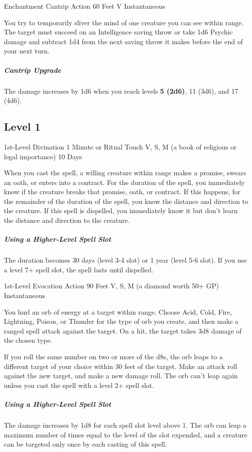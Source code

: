 \documentclass[letterpaper,openany,oneside,twocolumn]{book}
\begin{document}
	{Enchantment Cantrip}
	{Action}
	{60 Feet}
	{V}
	{Instantaneous}

You try to temporarily sliver the mind of one creature you can see within range. The target must succeed on an Intelligence saving throw or take 1d6 Psychic damage and subtract 1d4 from the next saving throw it makes before the end of your next turn.

\subparagraph*{Cantrip Upgrade} The damage increases by 1d6 when you reach levels \textbf{5 (2d6)}, 11 (3d6), and 17 (4d6).

\subsection*{Level 1}

	{1st-Level Divination}
	{1 Minute or Ritual}
	{Touch}
	{V, S, M (a book of religious or legal importance)}
	{10 Days}

When you cast the spell, a willing creature within range makes a promise, swears an oath, or enters into a contract. For the duration of the spell, you immediately know if the creature breaks that promise, oath, or contract. If this happens, for the remainder of the duration of the spell, you know the distance and direction to the creature. If this spell is dispelled, you immediately know it but don't learn the distance and direction to the creature.

\subparagraph*{Using a Higher-Level Spell Slot} The duration becomes 30 days (level 3-4 slot) or 1 year (level 5-6 slot). If you use a level 7+ spell slot, the spell lasts until dispelled.

	{1st-Level Evocation}
	{Action}
	{90 Feet}
	{V, S, M (a diamond worth 50+ GP)}
	{Instantaneous}

You hurl an orb of energy at a target within range. Choose Acid, Cold, Fire, Lightning, Poison, or Thunder for the type of orb you create, and then make a ranged spell attack against the target. On a hit, the target takes 3d8 damage of the chosen type.

If you roll the same number on two or more of the d8s, the orb leaps to a different target of your choice within 30 feet of the target. Make an attack roll against the new target, and make a new damage roll. The orb can't leap again unless you cast the spell with a level 2+ spell slot.

\subparagraph*{Using a Higher-Level Spell Slot} The damage increases by 1d8 for each spell slot level above 1. The orb can leap a maximum number of times equal to the level of the slot expended, and a creature can be targeted only once by each casting of this spell.
\end{document}
